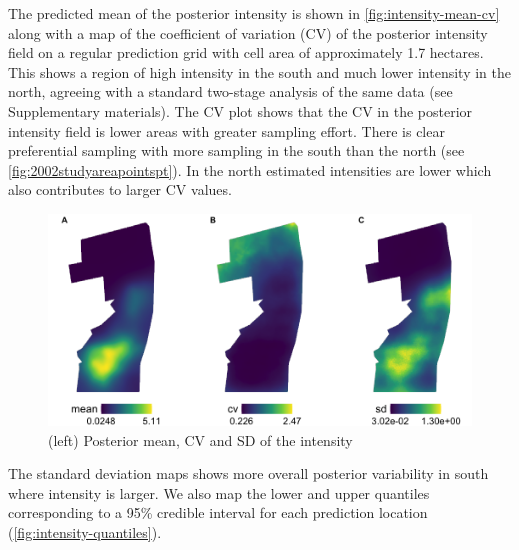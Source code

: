 \documentclass[preprint,12pt]{elsarticle}
\begin{document}
The predicted mean of the posterior intensity is shown in \autoref{fig:intensity-mean-cv} along with a map of the coefficient of variation (CV) of the posterior intensity field on a regular prediction grid with cell area of approximately 1.7 hectares.  This shows a region of high intensity in the south and much lower intensity in the north, agreeing with a standard two-stage analysis of the same data (see Supplementary materials).  The CV plot shows that the CV in the posterior intensity field is lower areas with greater sampling effort.  There is clear preferential sampling with more sampling in the south than the north  (see \autoref{fig:2002studyareapointspt}).  In the north estimated intensities are lower which also contributes to larger CV values.
\begin{figure}
	\includegraphics[scale=0.5]{figures/intensity_mean_cv_sd.png}
	\caption{(left) Posterior mean, CV and SD of the intensity}
	\label{fig:intensity-mean-cv}
\end{figure}
The standard deviation maps shows more overall posterior variability in south where intensity is larger.  We also map the lower and upper quantiles corresponding to a 95\% credible interval for each prediction location (\autoref{fig:intensity-quantiles}).
\end{document}
